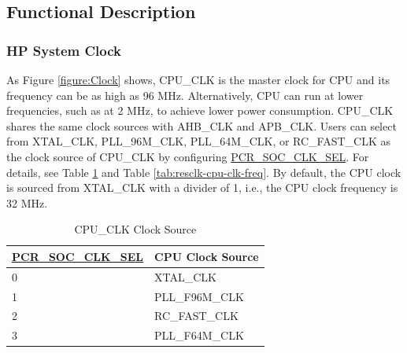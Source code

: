 \documentclass[main\_\_EN.tex]{subfiles}
\begin{document}
\subsection{Functional Description}

\subsubsection{HP System Clock}

As Figure \ref{figure:Clock} shows, CPU\_CLK is the master clock for CPU and its frequency can be as high as 96 MHz. Alternatively, CPU can run at lower frequencies, such as at 2 MHz, to achieve lower power consumption. CPU\_CLK shares the same clock sources with AHB\_CLK and APB\_CLK. Users can select from XTAL\_CLK, PLL\_96M\_CLK, PLL\_64M\_CLK, or RC\_FAST\_CLK as the clock source of CPU\_CLK by configuring  \hyperref[fielddesc:PCRSOCCLKSEL]{PCR\_SOC\_CLK\_SEL}. For details, see Table  \ref{tab:resclk-cpu-clk-src} and Table \ref{tab:resclk-cpu-clk-freq}. By default, the CPU clock is sourced from XTAL\_CLK with a divider of 1, i.e., the CPU clock frequency is 32 MHz.

\begin{longtable}[c]{|p{5cm}|p{5cm}| }
       \caption{CPU\_CLK Clock Source}
		\label{tab:resclk-cpu-clk-src} \\
	    \hline
        \rowcolor{lightgray}
        \textbf{\hyperref[fielddesc:PCRSOCCLKSEL]{PCR\_SOC\_CLK\_SEL}} & \textbf{CPU Clock Source} \\
        \hline
        0 & XTAL\_CLK \\
        \hline
        1 & PLL\_F96M\_CLK \\
        \hline
        2 & RC\_FAST\_CLK \\
        \hline
        3 & PLL\_F64M\_CLK \\
        \hline
\end{longtable}
\end{document}

